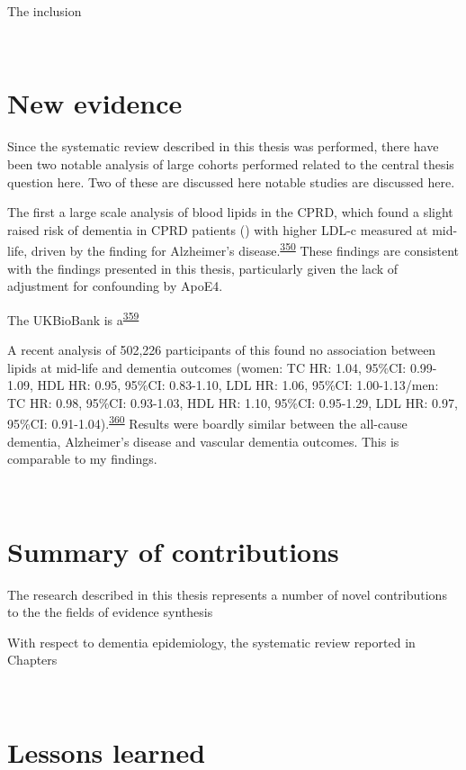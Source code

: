 \documentclass[a4paper, twoside]{templates/ociamthesis}
\begin{document}
The inclusion

~

\hypertarget{new-evidence}{%
\section{New evidence}\label{new-evidence}}

Since the systematic review described in this thesis was performed, there have been two notable analysis of large cohorts performed related to the central thesis question here. Two of these are discussed here notable studies are discussed here.

The first a large scale analysis of blood lipids in the CPRD, which found a slight raised risk of dementia in CPRD patients () with higher LDL-c measured at mid-life, driven by the finding for Alzheimer's disease.\textsuperscript{\protect\hyperlink{ref-iwagami2021}{350}} These findings are consistent with the findings presented in this thesis, particularly given the lack of adjustment for confounding by ApoE4.

The UKBioBank is a\textsuperscript{\protect\hyperlink{ref-sudlow2015}{359}}

A recent analysis of 502,226 participants of this found no association between lipids at mid-life and dementia outcomes (women: TC HR: 1.04, 95\%CI: 0.99-1.09, HDL HR: 0.95, 95\%CI: 0.83-1.10, LDL HR: 1.06, 95\%CI: 1.00-1.13/men: TC HR: 0.98, 95\%CI: 0.93-1.03, HDL HR: 1.10, 95\%CI: 0.95-1.29, LDL HR: 0.97, 95\%CI: 0.91-1.04).\textsuperscript{\protect\hyperlink{ref-gong2021}{360}} Results were boardly similar between the all-cause dementia, Alzheimer's disease and vascular dementia outcomes. This is comparable to my findings.

~

\hypertarget{summary-of-contributions}{%
\section{Summary of contributions}\label{summary-of-contributions}}

The research described in this thesis represents a number of novel contributions to the the fields of evidence synthesis

With respect to dementia epidemiology, the systematic review reported in Chapters

~

\hypertarget{lessons-learned}{%
\section{Lessons learned}\label{lessons-learned}}
\end{document}
